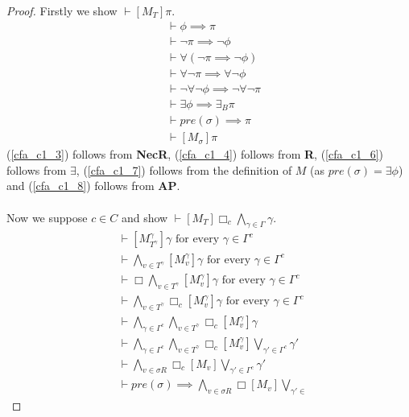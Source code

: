 \documentclass[12pt, a4paper, titlepage]{article}
\numberwithin{equation}{section}
\newcommand{\sqex}[1]{[{#1}]}
\newcommand{\axAP}{{\bf AP}}
\newcommand{\axR}{{\bf R}}
\newcommand{\axNecR}{{\bf NecR}}
\begin{document}
\begin{proof}
Firstly we show $\vdash \sqex{M_T} \pi$.
\begin{align}
	& \vdash \phi \implies \pi \label{cfa_c1_1} \\
	& \vdash \neg \pi \implies \neg \phi \label{cfa_c1_2}\\
	& \vdash \forall (\neg \pi \implies \neg \phi) \label{cfa_c1_3}\\
	& \vdash \forall \neg \pi \implies \forall \neg \phi \label{cfa_c1_4}\\
	& \vdash \neg \forall \neg \phi \implies \neg \forall \neg \pi \label{cfa_c1_5}\\
	& \vdash \exists \phi \implies \exists_B \pi \label{cfa_c1_6}\\
	& \vdash pre(\sigma) \implies \pi \label{cfa_c1_7}\\
	& \vdash \sqex{M_\sigma} \pi \label{cfa_c1_8}
\end{align}
(\ref{cfa_c1_3}) follows from \axNecR, (\ref{cfa_c1_4}) follows from \axR, (\ref{cfa_c1_6}) follows from
$\exists$, (\ref{cfa_c1_7}) follows from the definition of $M$ (as $pre(\sigma) = \exists \phi$) and
(\ref{cfa_c1_8}) follows from \axAP.\\
\\
Now we suppose $c \in C$ and show $\vdash \sqex{M_T} \Box_c \bigwedge_{\gamma \in \Gamma} \gamma$.
\begin{align}
	& \vdash \sqex{M^{\gamma}_{T^{\gamma}}} \gamma \text{ for every }\gamma \in \Gamma^c
	\label{cfa_c2_1} \\
	& \vdash \bigwedge_{v \in T^\gamma} \sqex{M^\gamma_v} \gamma \text{ for every }\gamma \in \Gamma^c \label{cfa_c2_2} \\
	& \vdash \Box \bigwedge_{v \in T^\gamma} \sqex{M^\gamma_v} \gamma \text{ for every } \gamma \in
	\Gamma^c\label{cfa_c2_3} \\
	& \vdash \bigwedge_{v \in T^\gamma} \Box_c \sqex{M^\gamma_v} \gamma \text{ for every } \gamma \in
	\Gamma^c\label{cfa_c2_4} \\
	& \vdash \bigwedge_{\gamma \in \Gamma^c} \bigwedge_{v \in T^\gamma} \Box_c \sqex{M^\gamma_v} \gamma\label{cfa_c2_5} \\
	& \vdash \bigwedge_{\gamma \in \Gamma^c} \bigwedge_{v \in T^\gamma} \Box_c \sqex{M^\gamma_v}
	\bigvee_{\gamma' \in \Gamma^c} \gamma'\label{cfa_c2_6} \\
	& \vdash \bigwedge_{v \in \sigma R} \Box_c \sqex{M_v}\bigvee_{\gamma' \in \Gamma^c} \gamma'\label{cfa_c2_7} \\
	& \vdash pre(\sigma) \implies \bigwedge_{v \in \sigma R} \Box \sqex{M_v} \bigvee_{\gamma' \in
}
\end{align}
\end{proof}
\end{document}

